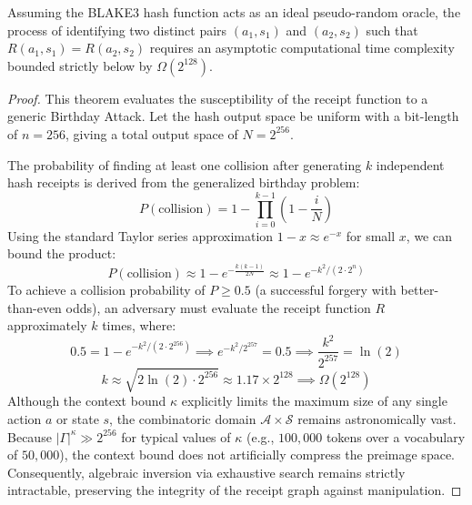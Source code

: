 \begin{theorem}
\label{thm:collision_resistance}
Assuming the BLAKE3 hash function acts as an ideal pseudo-random oracle, the process of identifying two distinct pairs $(a_1, s_1)$ and $(a_2, s_2)$ such that $R(a_1, s_1) = R(a_2, s_2)$ requires an asymptotic computational time complexity bounded strictly below by $\Omega(2^{128})$.
\end{theorem}

\begin{proof}
This theorem evaluates the susceptibility of the receipt function to a generic Birthday Attack. Let the hash output space be uniform with a bit-length of $n=256$, giving a total output space of $N = 2^{256}$. 

The probability of finding at least one collision after generating $k$ independent hash receipts is derived from the generalized birthday problem:
\begin{equation}
P(\text{collision}) = 1 - \prod_{i=0}^{k-1} \left(1 - \frac{i}{N}\right)
\end{equation}
Using the standard Taylor series approximation $1 - x \approx e^{-x}$ for small $x$, we can bound the product:
\begin{equation}
P(\text{collision}) \approx 1 - e^{-\frac{k(k-1)}{2N}} \approx 1 - e^{-k^2 / (2 \cdot 2^n)}
\end{equation}
To achieve a collision probability of $P \ge 0.5$ (a successful forgery with better-than-even odds), an adversary must evaluate the receipt function $R$ approximately $k$ times, where:
\begin{equation}
0.5 = 1 - e^{-k^2 / (2 \cdot 2^{256})} \implies e^{-k^2 / 2^{257}} = 0.5 \implies \frac{k^2}{2^{257}} = \ln(2)
\end{equation}
\begin{equation}
k \approx \sqrt{2 \ln(2) \cdot 2^{256}} \approx 1.17 \times 2^{128} \implies \Omega(2^{128})
\end{equation}
Although the context bound $\kappa$ explicitly limits the maximum size of any single action $a$ or state $s$, the combinatoric domain $\mathcal{A} \times \mathcal{S}$ remains astronomically vast. Because $|\Gamma|^\kappa \gg 2^{256}$ for typical values of $\kappa$ (e.g., $100,000$ tokens over a vocabulary of $50,000$), the context bound does not artificially compress the preimage space. Consequently, algebraic inversion via exhaustive search remains strictly intractable, preserving the integrity of the receipt graph against manipulation.
\end{proof}

